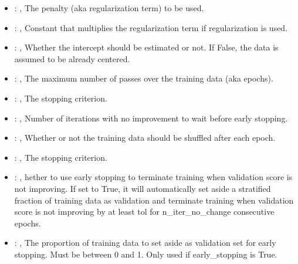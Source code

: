 \begin{itemize}
    \item {}: \xmlDesc{[l2,  l1, elasticnet]}, 
      The penalty (aka regularization term) to be used.

    \item {}: , 
      Constant that multiplies the regularization term if regularization is used.

    \item {}: , 
      Whether the intercept should be estimated or not. If False,
      the data is assumed to be already centered.

    \item {}: , 
      The maximum number of passes over the training data (aka epochs).

    \item {}: , 
      The stopping criterion.

    \item {}: , 
      Number of iterations with no improvement to wait before early stopping.

    \item {}: , 
      Whether or not the training data should be shuffled after each epoch.

    \item {}: , 
      The stopping criterion.

    \item {}: , 
      hether to use early stopping to terminate training when validation score is not
      improving. If set to True, it will automatically set aside a stratified fraction of training
      data as validation and terminate training when validation score is not improving by at least
      tol for n\_iter\_no\_change consecutive epochs.

    \item {}: , 
      The proportion of training data to set aside as validation set for early stopping.
      Must be between 0 and 1. Only used if early\_stopping is True.


\end{itemize}
